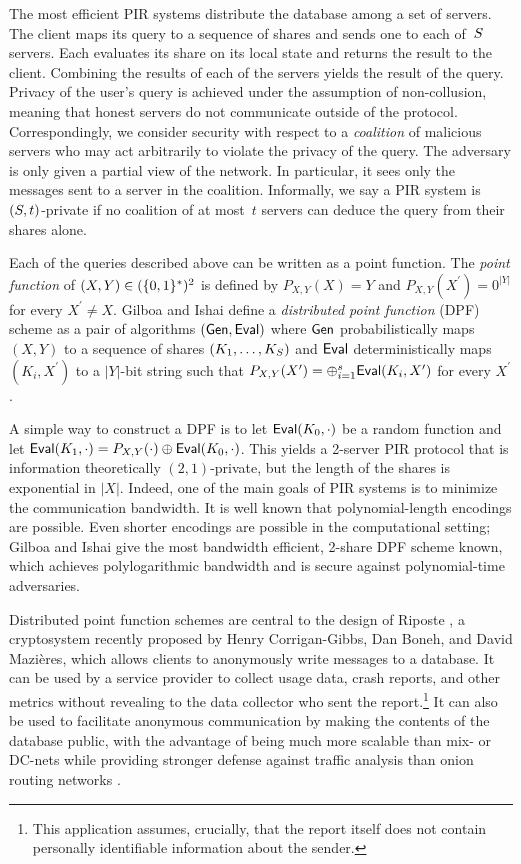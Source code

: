 The most efficient PIR systems distribute the database among a set of servers.
%
The client maps its query to a sequence of shares and sends one to each
of~$S$ servers. Each evaluates its share on its local state and returns
the result to the client. Combining the results of each of the servers yields
the result of the query.
%
Privacy of the user's query is achieved under the assumption of non-collusion,
meaning that honest servers do not communicate outside of the protocol.
Correspondingly, we consider security with respect to a \emph{coalition} of
malicious servers who may act arbitrarily to violate the privacy of the query.
%
The adversary is only given a partial view of the network. In particular, it
sees only the messages sent to a server in the coalition.
%
Informally, we say a PIR system is $(S,t)$-private if no coalition of at
most~$t$ servers can deduce the query from their shares alone.

Each of the queries described above can be written as a point function.
%
The \emph{point function} of $(X,Y) \in (\{0,1\}^*)^2$ is defined by $P_{X,Y}(X) =
Y$ and $P_{X,Y}(X^\prime) = 0^{|Y|}$ for every $X^\prime \ne X$.
%
Gilboa and Ishai define a \emph{distributed point function} (DPF) scheme as a
pair of algorithms $(\mathsf{Gen}, \mathsf{Eval})$ where $\mathsf{Gen}$ probabilistically maps $(X,Y)$
to a sequence of shares $(K_1, \ldots, K_S)$ and $\mathsf{Eval}$
deterministically maps $(K_i, X^\prime)$ to a $|Y|$-bit string such that
$P_{X,Y}(X^\prime) = \mathbin{\oplus}_{i=1}^s \mathsf{Eval}(K_i, X^\prime)$ for every $X^\prime$.

A simple way to construct a DPF is to let $\mathsf{Eval}(K_0, \cdot)$ be a random
function and let $\mathsf{Eval}(K_1, \cdot) = P_{X,Y}(\cdot) \mathbin{\oplus} \mathsf{Eval}(K_0, \cdot)$.
%
This yields a 2-server PIR protocol that is information theoretically
$(2,1)$-private, but the length of the shares is exponential in $|X|$. Indeed,
one of the main goals of PIR systems is to minimize the communication bandwidth.
%
It is well known that polynomial-length encodings are possible. Even shorter
encodings are possible in the computational setting; Gilboa and Ishai \cite{dpf}
give the most bandwidth efficient, 2-share DPF scheme known, which achieves
polylogarithmic bandwidth and is secure against polynomial-time adversaries.

Distributed point function schemes are central to the design of Riposte
\cite{riposte}, a cryptosystem recently proposed by Henry Corrigan-Gibbs, Dan
Boneh, and David Mazi\`{e}res,
which allows clients to anonymously write messages to a database. It can be used
by a service provider to collect usage data, crash reports, and other metrics
without revealing to the data collector who sent the report.\footnote{ This
application assumes, crucially, that the report itself does not contain
personally identifiable information about the sender.} It can also be used to
facilitate anonymous communication by making the contents of the database
public, with the advantage of being much more scalable than mix- or DC-nets
\cite{mix-nets,dc-nets} while providing stronger defense against traffic analysis
than onion routing networks \cite{tor}.


